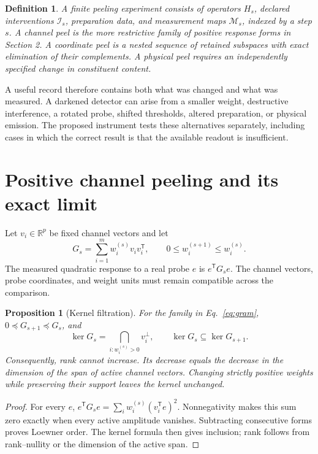 \documentclass[11pt]{article}
\newtheorem{proposition}{Proposition}
\newtheorem{definition}{Definition}
\newcommand{\R}{\mathbb R}
\begin{document}
\begin{definition}
A finite peeling experiment consists of operators $H_s$, declared interventions $\mathcal I_s$, preparation data, and measurement maps $\mathcal M_s$, indexed by a step $s$. A channel peel is the more restrictive family of positive response forms in Section 2. A coordinate peel is a nested sequence of retained subspaces with exact elimination of their complements. A physical peel requires an independently specified change in constituent content.
\end{definition}

A useful record therefore contains both what was changed and what was measured. A darkened detector can arise from a smaller weight, destructive interference, a rotated probe, shifted thresholds, altered preparation, or physical emission. The proposed instrument tests these alternatives separately, including cases in which the correct result is that the available readout is insufficient.

\section{Positive channel peeling and its exact limit}
Let $v_i\in\R^p$ be fixed channel vectors and let
\begin{equation}
G_s=\sum_{i=1}^{m}w_i^{(s)}v_i v_i^{\mathsf T},\qquad
0\leq w_i^{(s+1)}\leq w_i^{(s)}.
\label{eq:gram}
\end{equation}
The measured quadratic response to a real probe $e$ is $e^{\mathsf T}G_se$. The channel vectors, probe coordinates, and weight units must remain compatible across the comparison.

\begin{proposition}[Kernel filtration]
For the family in Eq.~\eqref{eq:gram}, $0\preceq G_{s+1}\preceq G_s$, and
\begin{equation}
\ker G_s=\bigcap_{i:w_i^{(s)}>0}v_i^\perp,
\qquad \ker G_s\subseteq\ker G_{s+1}.
\end{equation}
Consequently, rank cannot increase. Its decrease equals the decrease in the dimension of the span of active channel vectors. Changing strictly positive weights while preserving their support leaves the kernel unchanged.
\end{proposition}
\begin{proof}
For every $e$, $e^{\mathsf T}G_se=\sum_i w_i^{(s)}(v_i^{\mathsf T}e)^2$. Nonnegativity makes this sum zero exactly when every active amplitude vanishes. Subtracting consecutive forms proves Loewner order. The kernel formula then gives inclusion; rank follows from rank--nullity or the dimension of the active span.
\end{proof}
\end{document}

